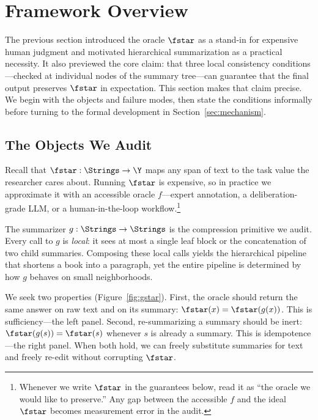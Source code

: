\section{Framework Overview}\label{sec:overview}

The previous section introduced the oracle $\fstar$ as a stand-in for expensive human judgment and motivated hierarchical summarization as a practical necessity. It also previewed the core claim: that three local consistency conditions---checked at individual nodes of the summary tree---can guarantee that the final output preserves $\fstar$ in expectation. This section makes that claim precise. We begin with the objects and failure modes, then state the conditions informally before turning to the formal development in Section~\ref{sec:mechanism}.

\subsection{The Objects We Audit}

Recall that $\fstar: \Strings \to \Y$ maps any span of text to the task value the researcher cares about. Running $\fstar$ is expensive, so in practice we approximate it with an accessible oracle $f$---expert annotation, a deliberation-grade LLM, or a human-in-the-loop workflow.\footnote{Whenever we write $\fstar$ in the guarantees below, read it as ``the oracle we would like to preserve.'' Any gap between the accessible $f$ and the ideal $\fstar$ becomes measurement error in the audit.}

The summarizer $g: \Strings \to \Strings$ is the compression primitive we audit. Every call to $g$ is \emph{local}: it sees at most a single leaf block or the concatenation of two child summaries. Composing these local calls yields the hierarchical pipeline that shortens a book into a paragraph, yet the entire pipeline is determined by how $g$ behaves on small neighborhoods.

We seek two properties (Figure~\ref{fig:gstar}). First, the oracle should return the same answer on raw text and on its summary: $\fstar(x) = \fstar(g(x))$. This is sufficiency---the left panel. Second, re-summarizing a summary should be inert: $\fstar(g(s)) = \fstar(s)$ whenever $s$ is already a summary. This is idempotence---the right panel. When both hold, we can freely substitute summaries for text and freely re-edit without corrupting $\fstar$.

